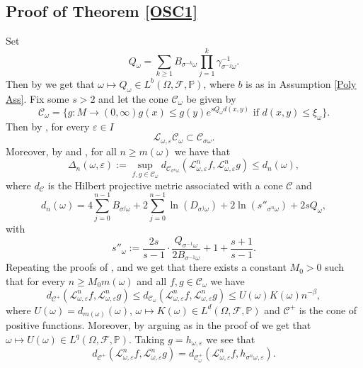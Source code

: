 \documentclass[11pt,reqno,a4paper]{article}
\theoremstyle{special}
\def\om{\omega}
\begin{document}
\subsection{Proof of Theorem \ref{OSC1}}
Set
$$
Q_\omega=\sum_{k\geq 1}B_{\sigma^{-k}\omega}\prod_{j=1}^k\gamma_{\sigma^{-j}\omega}^{-1}.
$$
Then by \cite[Lemma 5.13]{YH 23} we get that $\omega\mapsto Q_\om\in L^b(\Omega,\mathcal F,\mathbb P)$, where $b$ is as in Assumption \ref{Poly Ass}.  
Fix some $s>2$ and 
let the cone $\mathcal C_\omega$ be given by
$$
\mathcal C_\om=\{g:M\to (0,\infty) g(x)\leq g(y)e^{sQ_\omega d(x,y)}\text{ if }d(x,y)\leq \xi_\omega\}.
$$
Then by \cite[Lemma 5.7.3]{HK}, for every $\varepsilon\in I$
$$
\mathcal L_{\omega,\varepsilon}\mathcal C_\omega\subset \mathcal C_{\sigma\omega}.
$$
Moreover, by \cite[Lemma 5.7.3]{HK} and \cite[Eq. (5.7.18)]{HK}, for all $n\geq m(\omega)$ we have that
\begin{equation}\label{Diam est 1}
\Delta_{n}(\omega,\varepsilon):=
\sup_{f,g\in\mathcal C_\omega}d_{\mathcal C_{\sigma^n\omega}}(\mathcal L_{\omega,\varepsilon}^n f, \mathcal L_{\omega,\varepsilon}^n g)\leq 
 d_n(\omega),
\end{equation}
where $d_{\mathcal C}$ is the Hilbert projective metric associated with a cone $\mathcal C$ and 
$$
d_n(\omega)=4\sum_{j=0}^{n-1}B_{\sigma^j\om}+2\sum_{j=0}^{n-1}\ln (D_{\sigma^j\omega})+2\ln(s''_{\sigma^{n}\omega})+2sQ_\omega,
$$ 
with
$$
 s''_\omega:=\frac{2s}{s-1}\cdot \frac{Q_{\sigma^{-1}\omega}}{2B_{\sigma^{-1}\omega}}+1+\frac{s+1}{s-1}.
$$
Repeating the proofs of \cite[Eq. (5.24)]{YH 23}, \cite[Proposition 5.19]{YH 23} and \cite[Corollary 5.20]{YH 23} we get that  
there exists a constant $M_0>0$ such that for every $n\geq M_0m(\omega)$ and all $f,g\in\mathcal C_\omega$
we have 
\begin{equation}\label{Random Contraction}
d_{\mathcal C^+}(\mathcal L_{\om,\varepsilon}^n f,\mathcal L_{\om,\varepsilon}^n g)\leq d_{\mathcal C_\om}(\mathcal L_{\om,\varepsilon}^n f,\mathcal L_{\om,\varepsilon}^n g)\leq U(\om) K(\omega)n^{-\beta} ,
\end{equation}
where $U(\om)=d_{m(\om)}(\om)$, $\omega\mapsto K(\omega)\in L^d(\Omega,\mathcal F,\mathbb P)$ and $\mathcal C^+$ is the cone of positive functions. 
Moreover, by arguing as in the proof of \cite[Lemma 5.16]{YH 23} we get that $\omega\mapsto U(\omega)\in L^q(\Omega,\mathcal F,\mathbb P)$.
Taking $g=h_{\omega,\varepsilon}$ we see that 
$$
d_{\mathcal C^+}(\mathcal L_{\om,\varepsilon}^n f,\mathcal L_{\om,\varepsilon}^n g)=d_{\mathcal C_\om^+}(\mathcal L_{\om, \varepsilon}^n f,h_{\sigma^n\omega, \varepsilon}).
$$
\end{document}
